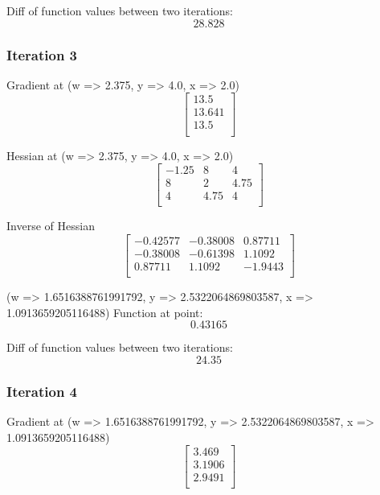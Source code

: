 \documentclass{article}
\begin{document}
Diff of function values between two iterations:
\begin{equation}
28.828
\end{equation}

\subsubsection{Iteration 3}
Gradient at (w => 2.375, y => 4.0, x => 2.0)
\begin{equation}
\left[
\begin{array}{c}
13.5 \\
13.641 \\
13.5 \\
\end{array}
\right]
\end{equation}

Hessian at (w => 2.375, y => 4.0, x => 2.0)
\begin{equation}
\left[
\begin{array}{ccc}
-1.25 & 8 & 4 \\
8 & 2 & 4.75 \\
4 & 4.75 & 4 \\
\end{array}
\right]
\end{equation}

Inverse of Hessian
\begin{equation}
\left[
\begin{array}{ccc}
-0.42577 & -0.38008 & 0.87711 \\
-0.38008 & -0.61398 & 1.1092 \\
0.87711 & 1.1092 & -1.9443 \\
\end{array}
\right]
\end{equation}

(w => 1.6516388761991792, y => 2.5322064869803587, x => 1.0913659205116488)
Function at point:
\begin{equation}
0.43165
\end{equation}

Diff of function values between two iterations:
\begin{equation}
24.35
\end{equation}

\subsubsection{Iteration 4}
Gradient at (w => 1.6516388761991792, y => 2.5322064869803587, x => 1.0913659205116488)
\begin{equation}
\left[
\begin{array}{c}
3.469 \\
3.1906 \\
2.9491 \\
\end{array}
\right]
\end{equation}
\end{document}
